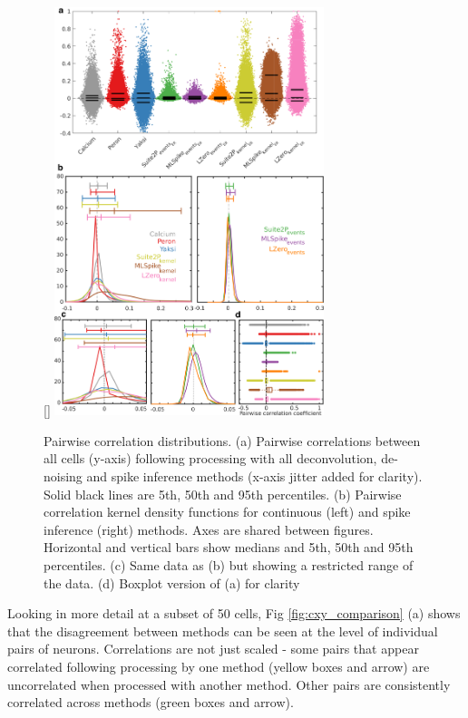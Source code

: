 \documentclass[a4paper,10pt,twocolumn]{article}
\begin{document}

\begin{figure}
[\FBwidth]
{\includegraphics[width=0.7\textwidth]{full_figs_19v2/why_deconvolve_F9_19v2.png}}
{\caption {\label{fig:cxy_dist}Pairwise correlation distributions. (a) Pairwise correlations between all cells (y-axis) following processing with all deconvolution, de-noising and spike inference methods (x-axis jitter added for clarity). Solid black lines are 5th, 50th and 95th percentiles. (b) Pairwise correlation kernel density functions for continuous (left) and spike inference (right) methods. Axes are shared between figures.  Horizontal and vertical bars show medians and 5th, 50th and 95th percentiles. (c) Same data as (b) but showing a restricted range of the data. (d) Boxplot version of (a) for clarity}}
\end{figure}

Looking in more detail at a subset of 50 cells, Fig \ref{fig:cxy_comparison} (a) shows that the disagreement between methods can be seen at the level of individual pairs of neurons.  Correlations are not just scaled - some pairs that appear correlated following processing by one method (yellow boxes and arrow) are uncorrelated when processed with another method. Other pairs are consistently correlated across methods (green boxes and arrow). 
\end{document}
